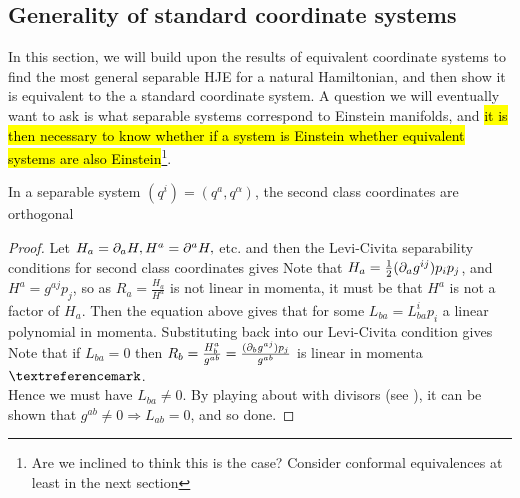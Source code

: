 \documentclass{article}
\begin{document}
\subsection{Generality of standard coordinate systems}

In this section, we will build upon the results of equivalent coordinate systems to find the most general separable HJE for a natural Hamiltonian, and then show it is equivalent to the a standard coordinate system. A question we will eventually want to ask is what separable systems correspond to Einstein manifolds, and \hl{it is then necessary to know whether if a system is Einstein whether equivalent systems are also Einstein}\footnote{Are we inclined to think this is the case? Consider conformal equivalences at least in the next section}.

\begin{prop}
In a separable system $(q^i) = (q^a, q^\alpha)$, the second class coordinates are orthogonal
\end{prop}
\begin{proof}
Let $H_a = \partial_a H, H^a = \partial^a H,$ etc. and then the Levi-Civita separability conditions for second class coordinates gives 
Note that $H_a = \frac{1}{2}(\partial_a g^{ij}) p_i p_j$, and $H^a = g^{aj}p_j$, so as $R_a = \frac{H_a}{H^a}$ is not linear in momenta, it must be that $H^a$ is not a factor of $H_a$. Then the equation above gives that 
for some $L_{ba} = L_{ba}^i p_i$ a linear polynomial in momenta. Substituting back into our Levi-Civita condition gives
Note that if $L_{ba}=0$ then $R_b = \frac{H_b^a}{g^{ab}} = \frac{(\partial_b g^{aj}) p_j}{g^{ab}}$ is linear in momenta $\contradiction$. \\
Hence we must have $L_{ba} \neq 0$. 
By playing about with divisors (see \cite{Benenti1991}), it can be shown that $g^{ab}\neq 0 \Rightarrow L_{ab}=0$, and so done. 
\end{proof}
\end{document}
